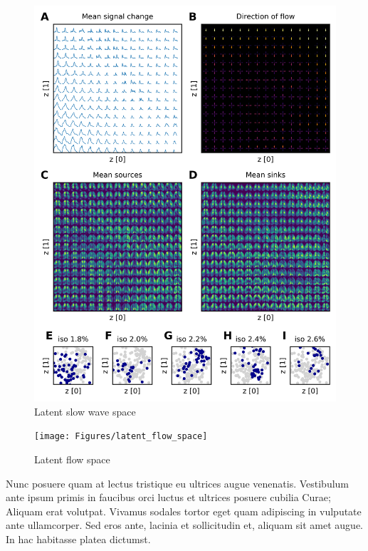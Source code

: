 \begin{figure}[!htb]
\centering
\includegraphics[width=\textwidth,height=\textheight,keepaspectratio]{Figures/latent_slow_wave_space}
\decoRule
\caption[Latent slow wave space]{Latent slow wave space}
\label{fig:latent_slow_wave_space}
\end{figure}

\begin{figure}[!htb]
\centering
\texttt{[image: Figures/latent\_flow\_space]}
\decoRule
\caption[Latent flow space]{Latent flow space}
\label{fig:latent_flow_space}
\end{figure}

Nunc posuere quam at lectus tristique eu ultrices augue venenatis. Vestibulum ante ipsum primis in faucibus orci luctus et ultrices posuere cubilia Curae; Aliquam erat volutpat. Vivamus sodales tortor eget quam adipiscing in vulputate ante ullamcorper. Sed eros ante, lacinia et sollicitudin et, aliquam sit amet augue. In hac habitasse platea dictumst.

